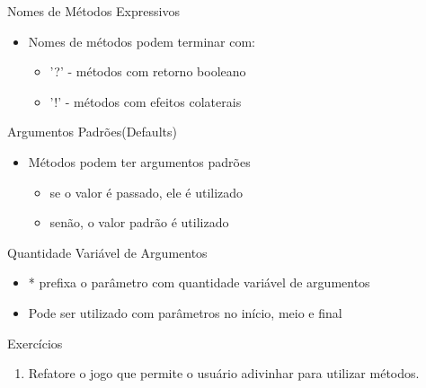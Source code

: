 \begin{frame}[fragile,t]{Nomes de Métodos Expressivos}
  \begin{itemize}
    \item Nomes de métodos podem terminar com:
    \begin{itemize}
    	\item \alert{'?'} - métodos com retorno booleano
    	\item \alert{'!'} - métodos com efeitos colaterais
    \end{itemize}
    
	
  \end{itemize}   
\end{frame}

\begin{frame}[fragile,t]{Argumentos Padrões(Defaults)}
  \begin{itemize}
    \item Métodos podem ter argumentos padrões
    \begin{itemize}
    	\item se o valor é passado, ele é utilizado
    	\item senão, o valor padrão é utilizado
    \end{itemize}
  \end{itemize}  
  
\end{frame}

\begin{frame}[fragile,t]{Quantidade Variável de Argumentos}
  \begin{itemize}
    \item \alert{*} prefixa o parâmetro com quantidade variável de argumentos
  \end{itemize}
  \begin{itemize}
    \item Pode ser utilizado com parâmetros no início, meio e final
  \end{itemize}
  
\end{frame}
\begin{frame}[fragile,t]{Exercícios}
  \begin{enumerate}
    \item Refatore o jogo que permite o usuário adivinhar para utilizar métodos. 
  \end{enumerate}
\end{frame}

